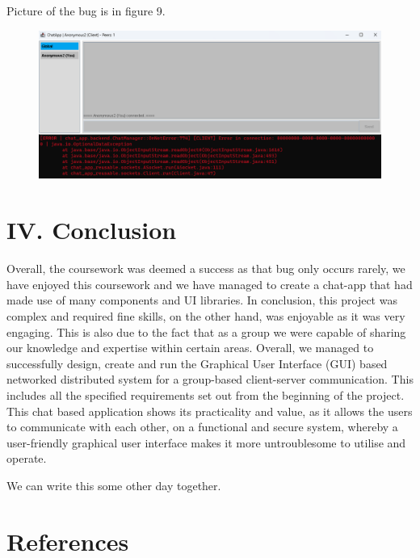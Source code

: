 \documentclass{COMPXXXX}
\begin{document}
{Picture of the bug is in figure 9.\\
\begin{figure}
\centering
\includegraphics[width=1.0\linewidth]{Bug.png}
\caption{}
\label{fig:figure09}
\end{figure}}

\section{IV. Conclusion}

\normalsize \textrm {Overall, the coursework was deemed a success as that bug only occurs rarely, we have enjoyed this coursework and we have managed to create  a chat-app that had made use of many components and UI libraries. In conclusion, this project was complex and required fine skills, on the other hand, was enjoyable as it was very engaging. This is also due to the fact that as a group we were capable of sharing our knowledge and expertise within certain areas. Overall, we managed to successfully design, create and run the Graphical User Interface (GUI) based networked distributed system for a group-based client-server communication. This includes all the specified requirements set out from the beginning of the project. This chat based application shows its practicality and value, as it allows the users to communicate with each other, on a functional and secure system, whereby a user-friendly graphical user interface makes it more untroublesome to utilise and operate.}

\ack

\normalsize \textrm {We can write this some other day together.}

\normalsize \textrm {}

\section{References}
\end{document}
